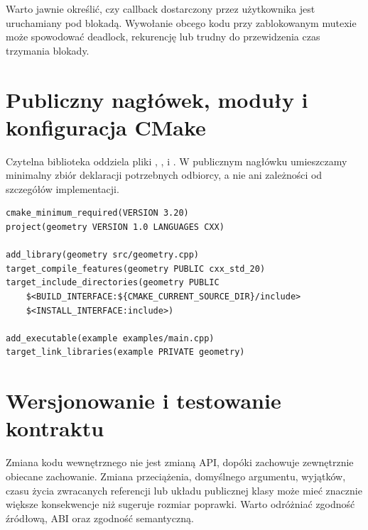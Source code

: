 Warto jawnie określić, czy callback dostarczony przez użytkownika
jest uruchamiany pod blokadą. Wywołanie obcego kodu przy zablokowanym
mutexie może spowodować deadlock, rekurencję lub trudny do przewidzenia
czas trzymania blokady.

\section{Publiczny nagłówek, moduły i konfiguracja CMake}

Czytelna biblioteka oddziela pliki , ,
 i . W publicznym nagłówku umieszczamy
minimalny zbiór deklaracji potrzebnych odbiorcy, a nie  ani zależności od szczegółów implementacji.

\begin{lstlisting}[caption={Przykladowe CMakeLists.txt dla biblioteki publicznej.},language={}]
cmake_minimum_required(VERSION 3.20)
project(geometry VERSION 1.0 LANGUAGES CXX)

add_library(geometry src/geometry.cpp)
target_compile_features(geometry PUBLIC cxx_std_20)
target_include_directories(geometry PUBLIC
    $<BUILD_INTERFACE:${CMAKE_CURRENT_SOURCE_DIR}/include>
    $<INSTALL_INTERFACE:include>)

add_executable(example examples/main.cpp)
target_link_libraries(example PRIVATE geometry)
\end{lstlisting}


\section{Wersjonowanie i testowanie kontraktu}

Zmiana kodu wewnętrznego nie jest zmianą API, dopóki zachowuje
zewnętrznie obiecane zachowanie. Zmiana przeciążenia, domyślnego
argumentu, wyjątków, czasu życia zwracanych referencji lub układu
publicznej klasy może mieć znacznie większe konsekwencje niż sugeruje
rozmiar poprawki. Warto odróżniać zgodność źródłową, ABI oraz zgodność
semantyczną.

